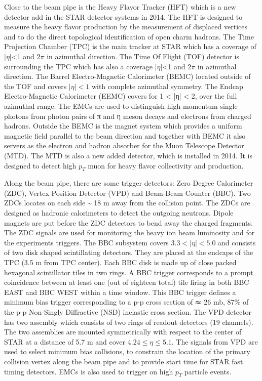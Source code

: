 Close to the beam pipe is the Heavy Flavor Tracker (HFT) which is
a new detector add in the STAR detector systems in 2014. The HFT is
designed to measure the heavy flavor production by the measurement
of displaced vertices and to do the direct topological identification
of open charm hadrons. The Time Projection Chamber (TPC) is the main
tracker at STAR which has a coverage of $|\eta|$<1 and $2\pi$ in
azimuthal direction. The Time Of Flight (TOF) detector is surrounding
the TPC which has also a coverage $|\eta|$<1 and $2\pi$ in azimuthal
direction. The Barrel Electro-Magnetic Calorimeter (BEMC) located
outside of the TOF and covers $|\eta|<1$ with complete azimuthal
symmetry. The Endcap Electro-Magnetic Calorimeter (EEMC) covers for
1 < |η| < 2, over the full azimuthal range. The EMCs are used to distinguish
high momentum single photons from photon pairs of π and η meson decays
and electrons from charged hadrons. Outside the BEMC is the magnet
system which provides a uniform magnetic field parallel to the beam
direction and together with BEMC it also servers as the electron and
hadron absorber for the Muon Telescope Detector (MTD). The MTD is
also a new added detector, which is installed in 2014. It is designed
to detect high $p_{T}$ muon for heavy flavor collectivity and production. 

Along the beam pipe, there are some trigger detectors: Zero Degree
Calorimeter (ZDC), Vertex Position Detector (VPD) and Beam-Beam Counter
(BBC). Two ZDCs locates on each side \textasciitilde{} 18 m away from
the collision point. The ZDCs are designed as hadronic calorimeters
to detect the outgoing neutrons. Dipole magnets are put before the
ZDC detectors to bend away the charged fragments. The ZDC signals
are used for monitoring the heavy ion beam luminosity and for the
experiments triggers. The BBC subsystem covers $3.3<|\eta|<5.0$ and
consists of two disk shaped scintillating detectors. They are placed
at the endcaps of the TPC (3.5 m from TPC center). Each BBC disk is
made up of close packed hexagonal scintillator tiles in two rings.
A BBC trigger corresponds to a prompt coincidence between at least
one (out of eighteen total) tile firing in both BBC EAST and BBC WEST
within a time window. This BBC trigger defines a minimum bias trigger
corresponding to a p-p cross section of $\thickapprox$ 26 mb, 87\%
of the p-p Non-Singly Diffractive (NSD) inelastic cross section. The
VPD detector has two assembly which consists of two rings of readout
detectors (19 channels). The two assemblies are mounted symmetrically
with respect to the center of STAR at a distance of 5.7 m and cover
$4.24\le\eta\le5.1$. The signals from VPD are used to select minimum
bias collisions, to constrain the location of the primary collision
vertex along the beam pipe and to provide start time for STAR fast
timing detectors. EMCs is also used to trigger on high $p_{T}$ particle
events.

